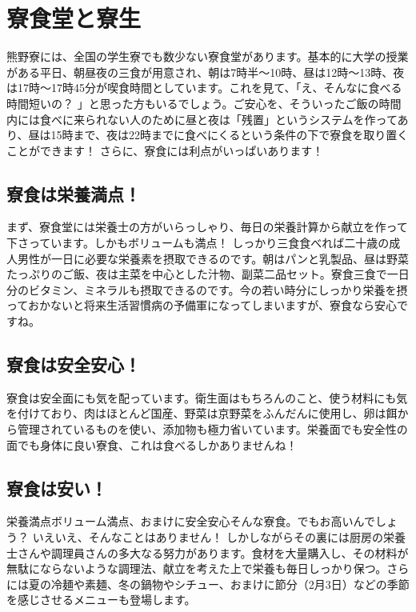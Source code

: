 \section{寮食堂と寮生}	\label{sec:cafeteria}
 	熊野寮には、全国の学生寮でも数少ない寮食堂があります。基本的に大学の授業がある平日、朝昼夜の三食が用意され、朝は7時半〜10時、昼は12時〜13時、夜は17時〜17時45分が喫食時間としています。これを見て、「え、そんなに食べる時間短いの？ 」と思った方もいるでしょう。ご安心を、そういったご飯の時間内には食べに来られない人のために昼と夜は「残置」というシステムを作ってあり、昼は15時まで、夜は22時までに食べにくるという条件の下で寮食を取り置くことができます！ さらに、寮食には利点がいっぱいあります！

  \subsection{寮食は栄養満点！ }
 	  まず、寮食堂には栄養士の方がいらっしゃり、毎日の栄養計算から献立を作って下さっています。しかもボリュームも満点！ しっかり三食食べれば二十歳の成人男性が一日に必要な栄養素を摂取できるのです。朝はパンと乳製品、昼は野菜たっぷりのご飯、夜は主菜を中心とした汁物、副菜二品セット。寮食三食で一日分のビタミン、ミネラルも摂取できるのです。今の若い時分にしっかり栄養を摂っておかないと将来生活習慣病の予備軍になってしまいますが、寮食なら安心ですね。

	\subsection{寮食は安全安心！ }
    寮食は安全面にも気を配っています。衛生面はもちろんのこと、使う材料にも気を付けており、肉はほとんど国産、野菜は京野菜をふんだんに使用し、卵は餌から管理されているものを使い、添加物も極力省いています。栄養面でも安全性の面でも身体に良い寮食、これは食べるしかありませんね！

	\subsection{寮食は安い！}
		栄養満点ボリューム満点、おまけに安全安心そんな寮食。でもお高いんでしょう？ いえいえ、そんなことはありません！ しかしながらその裏には厨房の栄養士さんや調理員さんの多大なる努力があります。食材を大量購入し、その材料が無駄にならないような調理法、献立を考えた上で栄養も毎日しっかり保つ。さらには夏の冷麺や素麺、冬の鍋物やシチュー、おまけに節分（2月3日）などの季節を感じさせるメニューも登場します。


